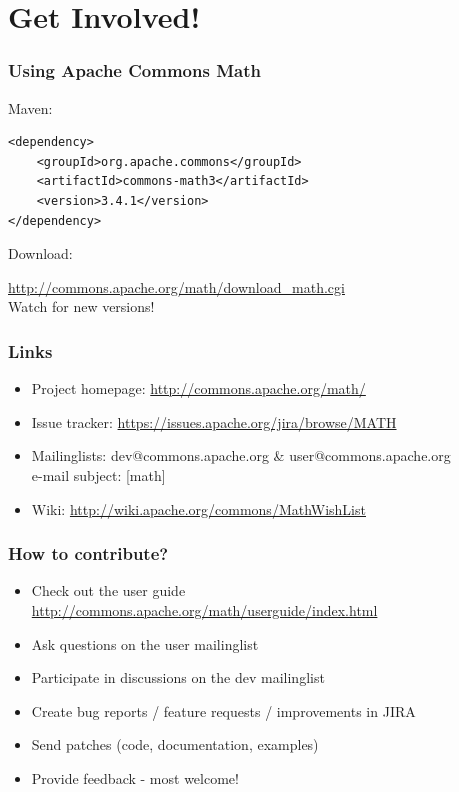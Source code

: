 \documentclass[14pt,mathserif]{beamer}
\begin{document}
\section[Getting involved]{Get Involved!}
\begin{frame}[fragile]
  \frametitle{Using Apache Commons Math}

Maven:

\begin{verbatim}
<dependency>
	<groupId>org.apache.commons</groupId>
	<artifactId>commons-math3</artifactId>
	<version>3.4.1</version>
</dependency>
\end{verbatim}

Download:

\url{http://commons.apache.org/math/download_math.cgi} \\

Watch for new versions!
            
\end{frame}

\begin{frame}
  \frametitle{Links}

\begin{itemize}
  \item Project homepage: \url{http://commons.apache.org/math/}
  \item Issue tracker: \url{https://issues.apache.org/jira/browse/MATH}
  \item Mailinglists: dev@commons.apache.org \& user@commons.apache.org \\
  e-mail subject: [math]
  \item Wiki: \url{http://wiki.apache.org/commons/MathWishList}
\end{itemize}

\end{frame}

\begin{frame}
  \frametitle{How to contribute?}

\begin{itemize}
  \item Check out the user guide \url{http://commons.apache.org/math/userguide/index.html}
  \item Ask questions on the user mailinglist
  \item Participate in discussions on the dev mailinglist
  \item Create bug reports / feature requests / improvements in JIRA
  \item Send patches (code, documentation, examples)
  \item Provide feedback - most welcome!
\end{itemize}

\end{frame}
\end{document}

